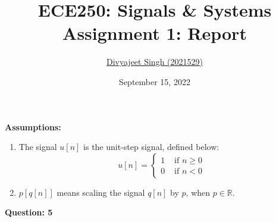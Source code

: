 \documentclass{article}
\title{
    \textbf{ECE250: Signals \& Systems} \\
    \large{Assignment 1: Report}
}
\author{\href{mailto:divyajeet21529@iiitd.ac.in}{Divyajeet Singh (2021529)}}
\date{September 15, 2022}
\begin{document}
    \maketitle

    \textbf{Assumptions:}

    \begin{enumerate}
        \item The signal $u[n]$ is the unit-step signal, defined below: \begin{equation}
            u[n] = \begin{cases}
                1 & \text{ if } n \geq 0 \\
                0 & \text{ if } n < 0
            \end{cases}
        \end{equation}

        \item $p[q[n]]$ means scaling the signal $q[n]$ by $p$, when $p \in \mathbb{R}$.
    \end{enumerate}

    \textbf{Question: 5}
\end{document}
